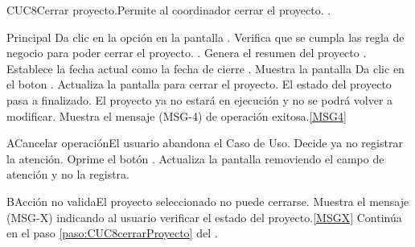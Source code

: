 % 

	\begin{UseCase}{CUC8}{Cerrar proyecto.}{Permite al coordinador cerrar el proyecto.}
		.
	\end{UseCase}
		
	\begin{UCtrayectoria}{Principal}
		\UCpaso[\UCactor] Da clic en la opción  en la pantalla .
		\UCpaso Verifica que se cumpla las regla de negocio para poder cerrar el proyecto. . 
		\UCpaso Genera el resumen del proyecto .
		\UCpaso Establece la fecha actual como la fecha de cierre .
		\UCpaso Muestra la pantalla \label{paso:CUC8cerrarProyecto}
		\UCpaso [\UCactor] Da clic en el boton .
		\UCpaso Actualiza la pantalla para cerrar el proyecto.
		\UCpaso El estado del proyecto pasa a finalizado. El proyecto ya no estará en ejecución y no se podrá volver a modificar.
		\UCpaso Muestra el mensaje (MSG-4) de operación exitosa.\ref{MSG4}
	\end{UCtrayectoria}
		
	\begin{UCtrayectoriaA}{A}{Cancelar operación}{El usuario abandona el Caso de Uso.}
			\UCpaso[\UCactor] Decide ya no registrar la atención.
			\UCpaso[\UCactor] Oprime el botón .
			\UCpaso Actualiza la pantalla removiendo el campo de atención y no la registra. 
	\end{UCtrayectoriaA}

	\begin{UCtrayectoriaA}{B}{Acción no valida}{El proyecto seleccionado no puede cerrarse.}
			\UCpaso Muestra el mensaje (MSG-X) indicando al usuario verificar el estado del proyecto.\ref{MSGX}
			\UCpaso Continúa en el paso \ref{paso:CUC8cerrarProyecto} del .
	\end{UCtrayectoriaA}